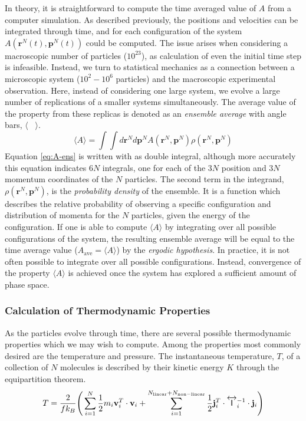In theory, it is straightforward to compute the time averaged value of
$A$ from a computer simulation. As described previously, the positions
and velocities can be integrated through time, and for each
configuration of the system $A(\mathbf{r}^N(t),\mathbf{p}^N(t))$ could
be computed. The issue arises when considering a macroscopic number of
particles ($10^{23}$), as calculation of even the initial time step is
infeasible. Instead, we turn to statistical mechanics as a connection
between a microscopic system ($10^2 - 10^6$ particles) and the
macroscopic experimental observation. Here, instead of considering one
large system, we evolve a large number of replications of a smaller
systems simultaneously. The average value of the property from these
replicas is denoted as an \textit{ensemble average} with angle bars,
$\langle$~ $\rangle$.
\begin{equation}\label{eq:A-ens}
\langle A \rangle = \int \int d\mathbf{r}^N d\mathbf{p}^N
A(\mathbf{r}^N,\mathbf{p}^N) \rho
(\mathbf{r}^N,\mathbf{p}^N)
\end{equation}
Equation \eqref{eq:A-ens} is written with as double integral, although
more accurately this equation indicates $6N$ integrals, one for each
of the $3N$ position and $3N$ momentum coordinates of the $N$
particles. The second term in the integrand,
$ \rho(\mathbf{r}^N,\mathbf{p}^N)$, is the \textit{probability
  density} of the ensemble. It is a function which describes the
relative probability of observing a specific configuration and
distribution of momenta for the $N$ particles, given the energy of the
configuration. If one is able to compute $\langle A \rangle$ by
integrating over all possible configurations of the system, the
resulting ensemble average will be equal to the time average value
($A_{\mathrm{ave}} = \langle A \rangle$) by the \textit{ergodic
  hypothesis}. In practice, it is not often possible to integrate over
all possible configurations. Instead, convergence of the property
$\langle A \rangle$ is achieved once the system has explored a
sufficient amount of phase space.

\subsubsection{Calculation of Thermodynamic Properties}
As the particles evolve through time, there are several possible
thermodynamic properties which we may wish to compute. Among the
properties most commonly desired are the temperature and pressure.
The instantaneous temperature, $T$, of a collection of $N$ molecules
is described by their kinetic energy $K$ through the equipartition
theorem.
\begin{equation}\label{Temperature}
T = \frac{2}{fk_B}\Bigg( \sum_{i=1}^{N} \frac{1}{2} m_i {\bf v}_i^T \cdot {\bf v}_i +
\sum_{i=1}^{N_{\mathrm{linear}}+N_{\mathrm{non-linear}}}  \frac{1}{2} {\bf j}_i^T \cdot
\overleftrightarrow{\mathsf{I}}_i^{-1} \cdot {\bf j}_i  \Bigg)
\end{equation}

